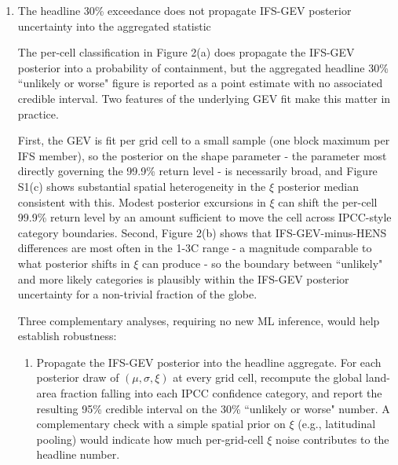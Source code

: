 \documentclass[11pt]{article}
\newcommand{\newTxt}{\textcolor{cadmiumgreen}}
\begin{document}
\begin{enumerate}
\newTxt{Regarding point (b), while generating comparable multi-year HENS hindcasts is out of scope for the paper at hand, we now include a comparison of GEV fits to IFS (a physics-based model) and the HENS-58 subset ensemble --- shown in Supplemental Figure S4 and also referenced in Figure 2 and described in Section 3.2 (lines 373-385). Our results show that the difference between the ensembles is primarily a location shift, and that the spread of each ensemble (GEV scale) and, most importantly, the tail index (GEV shape) are statistically indistinguishable essentially everywhere. This assessment provides confidence that HENS is preserving the shape of the upper tail relative to a comparable NWP ensemble.}


\item The headline 30\% exceedance does not propagate IFS-GEV posterior uncertainty into the aggregated statistic

The per-cell classification in Figure 2(a) does propagate the IFS-GEV posterior into a probability of containment, but the aggregated headline 30\% ``unlikely or worse" figure is reported as a point estimate with no associated credible interval. Two features of the underlying GEV fit make this matter in practice.

First, the GEV is fit per grid cell to a small sample (one block maximum per IFS member), so the posterior on the shape parameter - the parameter most directly governing the 99.9\% return level - is necessarily broad, and Figure S1(c) shows substantial spatial heterogeneity in the $\xi$ posterior median consistent with this. Modest posterior excursions in $\xi$ can shift the per-cell 99.9\% return level by an amount sufficient to move the cell across IPCC-style category boundaries. Second, Figure 2(b) shows that IFS-GEV-minus-HENS differences are most often in the 1-3C range - a magnitude comparable to what posterior shifts in $\xi$ can produce - so the boundary between ``unlikely" and more likely categories is plausibly within the IFS-GEV posterior uncertainty for a non-trivial fraction of the globe.

Three complementary analyses, requiring no new ML inference, would help establish robustness:

\begin{enumerate}
    \item Propagate the IFS-GEV posterior into the headline aggregate. For each posterior draw of $(\mu, \sigma, \xi)$ at every grid cell, recompute the global land-area fraction falling into each IPCC confidence category, and report the resulting 95\% credible interval on the 30\% ``unlikely or worse" number. A complementary check with a simple spatial prior on $\xi$ (e.g., latitudinal pooling) would indicate how much per-grid-cell $\xi$ noise contributes to the headline number.


\end{enumerate}
\end{enumerate}
\end{document}
